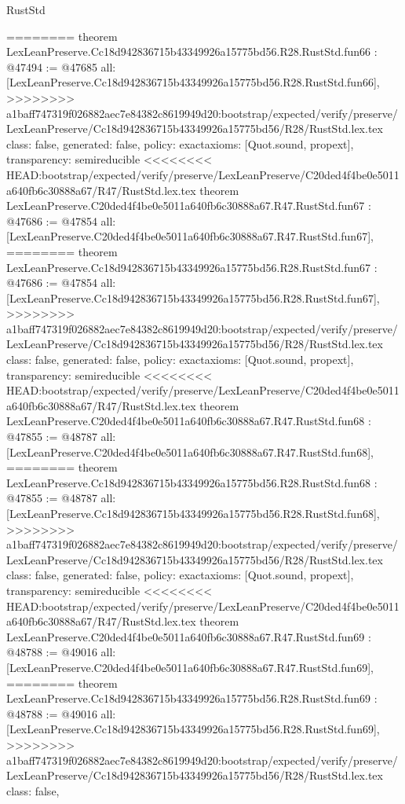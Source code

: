 \begin{lexlean}{RustStd}
\begin{coremodule}
{\begin{coremodule}
{{{{{{{{{{{{{{{{{{{{{{{{{{{{{{{{{{{{{{{{{{{{{{{{{{{{{{{{{{{{{{{{{{{{{========
theorem LexLeanPreserve.Cc18d942836715b43349926a15775bd56.R28.RustStd.fun66 : @47494 := @47685 {
  all: [LexLeanPreserve.Cc18d942836715b43349926a15775bd56.R28.RustStd.fun66],
>>>>>>>> a1baff747319f026882aec7e84382c8619949d20:bootstrap/expected/verify/preserve/LexLeanPreserve/Cc18d942836715b43349926a15775bd56/R28/RustStd.lex.tex
  class: false,
  generated: false,
  policy: exact{axioms: [Quot.sound, propext]},
  transparency: semireducible
}
<<<<<<<< HEAD:bootstrap/expected/verify/preserve/LexLeanPreserve/C20ded4f4be0e5011a640fb6c30888a67/R47/RustStd.lex.tex
theorem LexLeanPreserve.C20ded4f4be0e5011a640fb6c30888a67.R47.RustStd.fun67 : @47686 := @47854 {
  all: [LexLeanPreserve.C20ded4f4be0e5011a640fb6c30888a67.R47.RustStd.fun67],
========
theorem LexLeanPreserve.Cc18d942836715b43349926a15775bd56.R28.RustStd.fun67 : @47686 := @47854 {
  all: [LexLeanPreserve.Cc18d942836715b43349926a15775bd56.R28.RustStd.fun67],
>>>>>>>> a1baff747319f026882aec7e84382c8619949d20:bootstrap/expected/verify/preserve/LexLeanPreserve/Cc18d942836715b43349926a15775bd56/R28/RustStd.lex.tex
  class: false,
  generated: false,
  policy: exact{axioms: [Quot.sound, propext]},
  transparency: semireducible
}
<<<<<<<< HEAD:bootstrap/expected/verify/preserve/LexLeanPreserve/C20ded4f4be0e5011a640fb6c30888a67/R47/RustStd.lex.tex
theorem LexLeanPreserve.C20ded4f4be0e5011a640fb6c30888a67.R47.RustStd.fun68 : @47855 := @48787 {
  all: [LexLeanPreserve.C20ded4f4be0e5011a640fb6c30888a67.R47.RustStd.fun68],
========
theorem LexLeanPreserve.Cc18d942836715b43349926a15775bd56.R28.RustStd.fun68 : @47855 := @48787 {
  all: [LexLeanPreserve.Cc18d942836715b43349926a15775bd56.R28.RustStd.fun68],
>>>>>>>> a1baff747319f026882aec7e84382c8619949d20:bootstrap/expected/verify/preserve/LexLeanPreserve/Cc18d942836715b43349926a15775bd56/R28/RustStd.lex.tex
  class: false,
  generated: false,
  policy: exact{axioms: [Quot.sound, propext]},
  transparency: semireducible
}
<<<<<<<< HEAD:bootstrap/expected/verify/preserve/LexLeanPreserve/C20ded4f4be0e5011a640fb6c30888a67/R47/RustStd.lex.tex
theorem LexLeanPreserve.C20ded4f4be0e5011a640fb6c30888a67.R47.RustStd.fun69 : @48788 := @49016 {
  all: [LexLeanPreserve.C20ded4f4be0e5011a640fb6c30888a67.R47.RustStd.fun69],
========
theorem LexLeanPreserve.Cc18d942836715b43349926a15775bd56.R28.RustStd.fun69 : @48788 := @49016 {
  all: [LexLeanPreserve.Cc18d942836715b43349926a15775bd56.R28.RustStd.fun69],
>>>>>>>> a1baff747319f026882aec7e84382c8619949d20:bootstrap/expected/verify/preserve/LexLeanPreserve/Cc18d942836715b43349926a15775bd56/R28/RustStd.lex.tex
  class: false,
}}}}}}}}}}}}}}}}}}}}}}}}}}}}}}}}}}}}}}}}}}}}}}}}}}}}}}}}}}}}}}}}}}}}}}}}}
\end{coremodule}}
\end{coremodule}
\end{lexlean}

